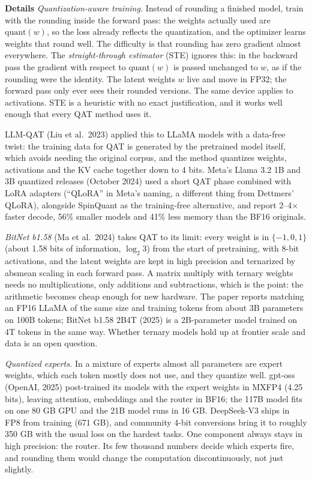 \documentclass[11pt,letterpaper]{article}
\newcommand{\para}[1]{\medskip\noindent\textbf{#1}\quad}
\begin{document}
\para{Details} \emph{Quantization-aware training.} Instead of rounding a finished model, train with the rounding inside the forward pass: the weights actually used are $\mathrm{quant}(w)$, so the loss already reflects the quantization, and the optimizer learns weights that round well. The difficulty is that rounding has zero gradient almost everywhere. The \emph{straight-through estimator} (STE) ignores this: in the backward pass the gradient with respect to $\mathrm{quant}(w)$ is passed unchanged to $w$, as if the rounding were the identity. The latent weights $w$ live and move in FP32; the forward pass only ever sees their rounded versions. The same device applies to activations. STE is a heuristic with no exact justification, and it works well enough that every QAT method uses it.

LLM-QAT (Liu et al.\ 2023) applied this to LLaMA models with a data-free twist: the training data for QAT is generated by the pretrained model itself, which avoids needing the original corpus, and the method quantizes weights, activations and the KV cache together down to 4 bits. Meta's Llama 3.2 1B and 3B quantized releases (October 2024) used a short QAT phase combined with LoRA adapters (``QLoRA'' in Meta's naming, a different thing from Dettmers' QLoRA), alongside SpinQuant as the training-free alternative, and report 2--4$\times$ faster decode, 56\% smaller models and 41\% less memory than the BF16 originals.

\emph{BitNet b1.58} (Ma et al.\ 2024) takes QAT to its limit: every weight is in $\{-1,0,1\}$ (about 1.58 bits of information, $\log_2 3$) from the start of pretraining, with 8-bit activations, and the latent weights are kept in high precision and ternarized by absmean scaling in each forward pass. A matrix multiply with ternary weights needs no multiplications, only additions and subtractions, which is the point: the arithmetic becomes cheap enough for new hardware. The paper reports matching an FP16 LLaMA of the same size and training tokens from about 3B parameters on 100B tokens; BitNet b1.58 2B4T (2025) is a 2B-parameter model trained on 4T tokens in the same way. Whether ternary models hold up at frontier scale and data is an open question.

\emph{Quantized experts.} In a mixture of experts almost all parameters are expert weights, which each token mostly does not use, and they quantize well. gpt-oss (OpenAI, 2025) post-trained its models with the expert weights in MXFP4 (4.25 bits), leaving attention, embeddings and the router in BF16; the 117B model fits on one 80 GB GPU and the 21B model runs in 16 GB. DeepSeek-V3 ships in FP8 from training (671 GB), and community 4-bit conversions bring it to roughly 350 GB with the usual loss on the hardest tasks. One component always stays in high precision: the router. Its few thousand numbers decide which experts fire, and rounding them would change the computation discontinuously, not just slightly.
\end{document}
